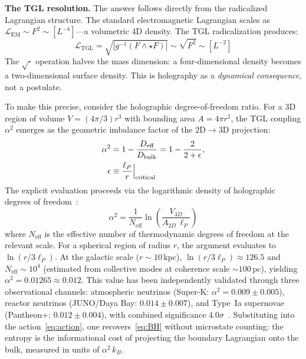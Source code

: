 \documentclass[12pt,a4paper,twocolumn]{article}
\newcommand{\alphaii}{\alpha^{2}}
\begin{document}
\textbf{The TGL resolution.} The answer follows directly from the radicalized 
Lagrangian structure. The standard electromagnetic Lagrangian scales as 
$\mathcal{L}_{\text{EM}} \sim F^2 \sim [L^{-4}]$---a volumetric 4D density. The 
TGL radicalization produces:
\begin{equation}
\mathcal{L}_{\text{TGL}} = \sqrt{|g^{-1}(F \wedge \star F)|} \sim \sqrt{F^2} 
\sim [L^{-2}]
\end{equation}
The $\sqrt{\cdot}$ operation halves the mass dimension: a four-dimensional 
density becomes a two-dimensional surface density. This is holography as a 
\emph{dynamical consequence}, not a postulate.

To make this precise, consider the holographic degree-of-freedom ratio. For a 
3D region of volume $V = (4\pi/3)r^3$ with bounding area $A = 4\pi r^2$, the 
TGL coupling $\alphaii$ emerges as the geometric imbalance factor of the 
$2\text{D} \to 3\text{D}$ projection:
\begin{align}
\alphaii &= 1 - \frac{D_{\text{eff}}}{D_{\text{bulk}}} = 1 - 
\frac{2}{2+\epsilon}, \notag\\
\epsilon &\equiv 
\frac{\ell_P}{r}\Big|_{\text{critical}}
\label{eq:alpha_derivation}
\end{align}
The explicit evaluation proceeds via the logarithmic density of holographic 
degrees of freedom~\cite{Miguel2026Acoplamento}:
\begin{equation}
\alphaii = \frac{1}{N_{\text{eff}}} \ln\!\left(\frac{V_{3D}}{A_{2D}\,\ell_P}\right)
\label{eq:alpha_explicit}
\end{equation}
where $N_{\text{eff}}$ is the effective number of thermodynamic degrees of 
freedom at the relevant scale. For a spherical region of radius $r$, the 
argument evaluates to $\ln(r/3\ell_P)$. At the galactic scale 
($r \sim 10\,$kpc), $\ln(r/3\ell_P) \approx 126.5$ and 
$N_{\text{eff}} \sim 10^4$ (estimated from collective modes at coherence 
scale $\sim 100\,$pc), yielding $\alphaii = 0.01265 \approx 0.012$. This 
value has been independently validated through three observational channels: 
atmospheric neutrinos (Super-K: $\alphaii = 0.009 \pm 0.005$), reactor 
neutrinos (JUNO/Daya Bay: $0.014 \pm 0.007$), and Type~Ia supernovae 
(Pantheon+: $0.012 \pm 0.004$), with combined significance 
$4.0\sigma$~\cite{Miguel2026Acoplamento}. Substituting 
into the action~\eqref{eq:action}, one recovers~\eqref{eq:BH} 
without microstate counting: the entropy is the informational cost of 
projecting the boundary Lagrangian onto the bulk, measured in units of 
$\alphaii\,k_B$.
\end{document}
